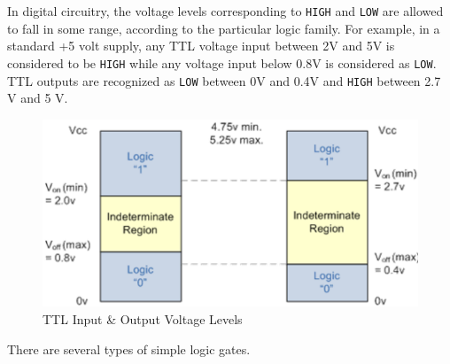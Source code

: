 In digital circuitry, the voltage levels corresponding to \verb|HIGH| and \verb|LOW| are allowed to fall in some range, according to the particular logic family. For example, in a standard +5 volt supply, any TTL voltage input between 2V and
5V is considered to be \verb|HIGH| while any voltage input below 0.8V is
considered as \verb|LOW|. TTL outputs are recognized as \verb|LOW| between 0V and 0.4V and \verb|HIGH| between 2.7 V and 5 V. \\

\begin{figure}[H]
    \centering
    \includegraphics[width=0.75\columnwidth]{images/range.png}
    \caption{TTL Input \& Output Voltage Levels}
    \label{range}
\end{figure}

\noindent There are several types of simple logic gates.\\

